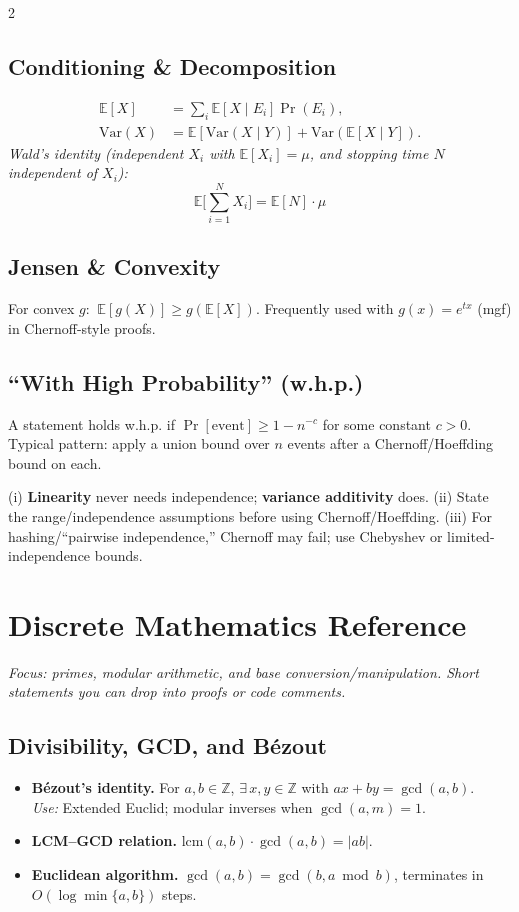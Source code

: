 \documentclass[8pt]{extarticle}
\theoremstyle{definition}
\begin{document}
\begin{multicols*}{2}
\subsection{Conditioning \& Decomposition}
\begin{align*}
\mathbb{E}[X]&=\sum_{i} \mathbb{E}[X\mid E_i]\Pr(E_i),\\
\mathrm{Var}(X)&=\mathbb{E}[\mathrm{Var}(X\mid Y)]+\mathrm{Var}(\mathbb{E}[X\mid Y]).
\end{align*}
\emph{Wald’s identity (independent $X_i$ with $\mathbb{E}[X_i]=\mu$, and stopping time $N$ independent of $X_i$): }
\[
\mathbb{E}\Big[\sum_{i=1}^N X_i\Big]=\mathbb{E}[N]\cdot \mu
\]

\subsection{Jensen \& Convexity}
For convex $g$: $\ \mathbb{E}[g(X)]\ge g(\mathbb{E}[X])$. Frequently used with $g(x)=e^{tx}$ (mgf) in Chernoff-style proofs.

\subsection{“With High Probability” (w.h.p.)}
A statement holds w.h.p. if $\Pr[\text{event}]\ge 1 - n^{-c}$ for some constant $c>0$. Typical pattern: apply a union bound over $n$ events after a Chernoff/Hoeffding bound on each.

\smallskip
(i) \textbf{Linearity} never needs independence; \textbf{variance additivity} does. 
(ii) State the range/independence assumptions before using Chernoff/Hoeffding. 
(iii) For hashing/“pairwise independence,” Chernoff may fail; use Chebyshev or limited-independence bounds.

\section{Discrete Mathematics Reference}\label{app:discrete}
\textit{Focus: primes, modular arithmetic, and base conversion/manipulation. Short statements you can drop into proofs or code comments.}

\subsection{Divisibility, GCD, and Bézout}
\begin{itemize}
  \item \textbf{Bézout's identity.} For $a,b\in\mathbb{Z}$, $\exists\,x,y\in\mathbb{Z}$ with $ax+by=\gcd(a,b)$. \\
        \emph{Use:} Extended Euclid; modular inverses when $\gcd(a,m)=1$.
  \item \textbf{LCM--GCD relation.} $\mathrm{lcm}(a,b)\cdot \gcd(a,b)=|ab|$.
  \item \textbf{Euclidean algorithm.} $\gcd(a,b)=\gcd(b,a\bmod b)$, terminates in $O(\log\min\{a,b\})$ steps.
\end{itemize}


\end{multicols*}
\end{document}
